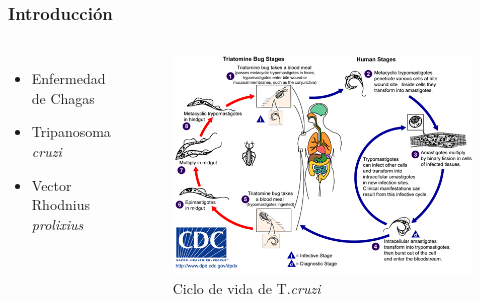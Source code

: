 \documentclass{beamer}
\begin{document}
\begin{frame}
\frametitle{Introducción}
\begin{columns}[c] %
\begin{itemize}
\item Enfermedad de Chagas
\item Tripanosoma \textit{cruzi}
\item Vector Rhodnius \textit{prolixius}
\end{itemize}
\begin{figure}[ht!]
\includegraphics[scale=0.45]{Trypanosoma_cruzi_LifeCycle.png} 
\caption{Ciclo de vida de T.\textit{cruzi}}
\end{figure}  
\end{columns}
\end{frame}

\end{document}

